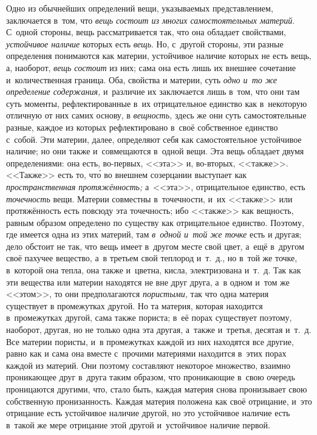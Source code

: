Одно из обычнейших определений вещи, указываемых представлением, заключается
в~том, что {\em вещь состоит из многих самостоятельных
материй}. С~одной стороны, вещь рассматривается так, что она обладает
свойствами, {\em устойчивое наличие} которых есть
{\em вещь}. Но, с~другой стороны, эти разные
определения понимаются как материи, устойчивое наличие которых не есть
вещь, а, наоборот, {\em вещь состоит} из них; сама она
есть лишь их внешнее сочетание и~количественная граница. Оба, свойства и
материи, суть {\em одно и~то же определение
содержания,} и~различие их заключается лишь в~том, что они там суть
моменты, рефлектированные в~их отрицательное единство как в~некоторую
отличную от них самих основу, в {\em вещность,} здесь
же они суть самостоятельные разные, каждое из которых рефлектировано в~своё
собственное единство с~собой. Эти материи, далее, определяют себя как
самостоятельное устойчивое наличие; но они также и~совмещаются в~одной
вещи. Эта вещь обладает двумя определениями: она есть, во-первых, <<эта>> и,
во-вторых, <<также>>. <<Также>> есть то, чт\'{о} во внешнем созерцании выступает
как {\em пространственная протяжённость;} а~<<эта>>,
отрицательное единство, есть {\em точечность} вещи.
Материи совместны в~точечности, и~их <<также>> или протяжённость есть повсюду
эта точечность; ибо <<также>> как вещность, равным образом определено по
существу как отрицательное единство. Поэтому, где имеется одна из этих
материй, там {\em в~одной и~той же точке} есть и
другая; дело обстоит не так, что вещь имеет в~другом месте свой цвет, а~ещё
в~другом своё пахучее вещество, а~в третьем свой теплород и~т.~д., но в~той
же точке, в~которой она тепла, она также и~цветна, кисла, электризована
и~т.~д. Так как эти вещества или материи находятся не вне друг друга, а~в
одном и~том же <<этом>>, то они предполагаются
{\em пористыми,} так что одна материя существует в
промежутках другой. Но та материя, которая находится в~промежутках другой,
сама также пориста; в~её порах существует поэтому, наоборот, другая, но не
только одна эта другая, а~также и~третья, десятая и~т.~д. Все материи
пористы, и~в промежутках каждой из них находятся все другие, равно как и
сама она вместе с~прочими материями находится в~этих порах каждой из
материй. Они поэтому составляют некоторое множество, взаимно проникающее
друг в~друга таким образом, что проникающие в~свою очередь проницаются
другими, что, стало быть, каждая материя снова пронизывает свою собственную
пронизанность. Каждая материя положена как своё отрицание, и~это отрицание
есть устойчивое наличие другой, но это устойчивое наличие есть в~такой же
мере отрицание этой другой и~устойчивое наличие первой.

